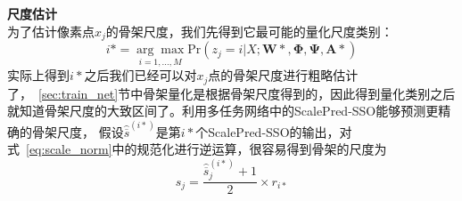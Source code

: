 \documentclass[UTF8]{ctexart}
\numberwithin{equation}{section} %
\numberwithin{table}{section} %
\begin{document}
\vspace{1em}
\noindent \textbf{尺度估计}\\
为了估计像素点$x_j$的骨架尺度，我们先得到它最可能的量化尺度类别：
\begin{equation}
i* = \underset{i=1,...,M}{\arg\max} \text{Pr}(z_j=i|X;\mathbf{W*},\mathbf{\Phi},\mathbf{\Psi},\mathbf{A*})
\label{eq:most_likely_cls}
\end{equation}
实际上得到$i*$之后我们已经可以对$x_j$点的骨架尺度进行粗略估计了，~\ref{sec:train_net}节中骨架量化是根据骨架尺度得到的，因此得到量化类别之后就知道骨架尺度的大致区间了。利用多任务网络中的ScalePred-SSO能够预测更精确的骨架尺度，
假设$\hat{\overline{s}}^{(i*)}$是第$i*$个ScalePred-SSO的输出，对式~\ref{eq:scale_norm}中的规范化进行逆运算，很容易得到骨架的尺度为
\begin{equation}
\hat{s}_j = \frac{\hat{\overline{s}}^{(i*)}_j + 1}{2} \times r_{i*}
\label{eq:get_sk_scale}
\end{equation}
\end{document}
